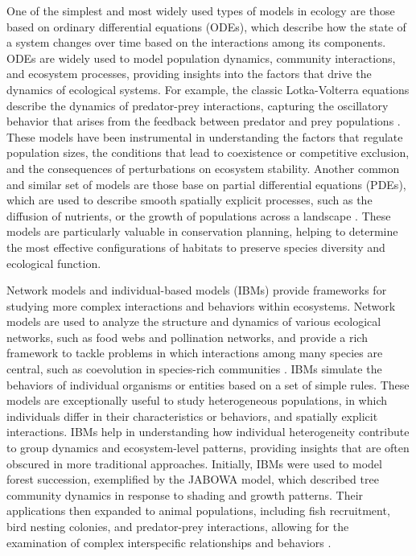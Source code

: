 One of the simplest and most widely used types of models in ecology are those
based on ordinary differential equations (ODEs), which describe how the state
of a system changes over time based on the interactions among its components.
ODEs are widely used to model population dynamics, community interactions, and
ecosystem processes, providing insights into the factors that drive the
dynamics of ecological systems. For example, the classic Lotka-Volterra
equations describe the dynamics of predator-prey interactions, capturing the
oscillatory behavior that arises from the feedback between predator and prey
populations \cite{Murray_book}. These models have been instrumental in
understanding the factors that regulate population sizes, the conditions that
lead to coexistence or competitive exclusion, and the consequences of
perturbations on ecosystem stability. Another common and similar set of models
are those base on partial differential equations (PDEs), which are used to
describe smooth spatially explicit processes, such as the diffusion of
nutrients, or the growth of populations across a landscape
\cite{Murray_book,tilman1997spatial,dale2014spatial}. These models are
particularly valuable in conservation planning, helping to determine the most
effective configurations of habitats to preserve species diversity and
ecological function.

Network models and individual-based models (IBMs) provide frameworks
for studying more complex interactions and behaviors within ecosystems. Network
models are used to analyze the structure and dynamics of various ecological
networks, such as food webs and pollination networks, and provide a rich
framework to tackle problems in which interactions among many species are
central, such as coevolution in species-rich communities \cite{Bascompte2007}.
IBMs simulate the behaviors of individual organisms or entities based on a set
of simple rules. These models are exceptionally useful to study heterogeneous
populations, in which individuals differ in their characteristics or behaviors,
and spatially explicit interactions. IBMs help in understanding how individual
heterogeneity contribute to group dynamics and ecosystem-level patterns,
providing insights that are often obscured in more traditional approaches.
Initially, IBMs were used to model forest succession, exemplified by the JABOWA
model, which described tree community dynamics in response to shading and
growth patterns. Their applications then expanded to animal populations,
including fish recruitment, bird nesting colonies, and predator-prey
interactions, allowing for the examination of complex interspecific
relationships and behaviors \cite{deangelis2014}.

